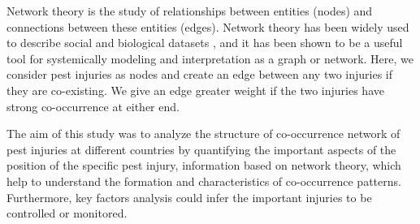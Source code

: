 Network theory is the study of relationships between entities (nodes) and connections between these entities (edges). Network theory has been widely used to describe social and biological datasets \cite{Moslonka_Lefebvre_2011}, and it has been shown to be a useful tool for systemically modeling and  interpretation as a graph or network. Here, we consider pest injuries as nodes and create an edge between any two injuries if they are co-existing. We give an edge greater weight if the two injuries have strong co-occurrence at either end. 

The aim of this study was to analyze the structure of co-occurrence network of pest injuries at different countries by quantifying the important aspects of the position of the specific pest injury, information based on network theory, which help to understand the formation and characteristics of co-occurrence patterns. Furthermore, key factors analysis could infer the important injuries to be controlled or monitored.